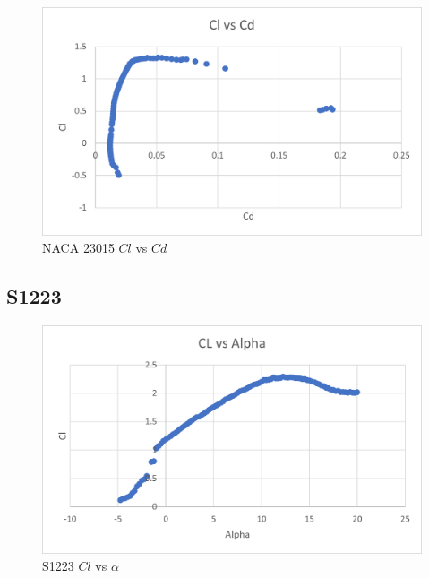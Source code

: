 \documentclass{article}
\begin{document}
\begin{figure}[!h]
\begin{center}
	\includegraphics[scale=0.7]{NACA 23015 ClCd.png}
	\caption{NACA 23015 $Cl$ vs $Cd$}
	\label{Figure6:}
\end{center}
\end{figure}

\newpage
\subsection{S1223}
\begin{figure}[!h]
\begin{center}
	\includegraphics[scale=0.7]{S1223 Clalpha.png}
	\caption{S1223 $Cl$ vs $\alpha$}
	\label{Figure7:}
\end{center}
\end{figure}
\end{document}
